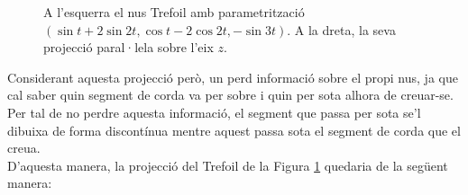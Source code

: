 \begin{figure}[h]
	\centering
	\begin{flushright}
	\end{flushright}
	\caption{A l'esquerra el nus Trefoil amb parametrització $(\sin t+2\sin 2t, \cos t-2\cos 2t,-\sin 3t)$. A la dreta, la seva projecció paral·lela sobre l'eix $z$.}\label{fig:projecció d'un nus sobre R2}
\end{figure}

Considerant aquesta projecció però, un perd informació sobre el propi nus, ja que cal saber quin segment de corda va per sobre i quin per sota alhora de creuar-se. Per tal de no perdre aquesta informació, el segment que passa per sota se'l dibuixa de forma discontínua mentre aquest passa sota el segment de corda que el creua.\\

\noindent
D'aquesta manera, la projecció del Trefoil de la Figura \ref{fig:projecció d'un nus sobre R2} quedaria de la següent manera:

